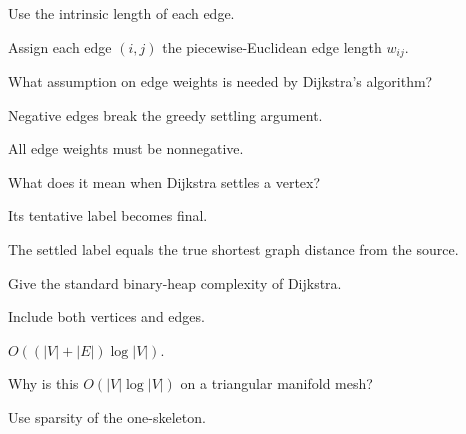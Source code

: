 \begin{hint}
Use the intrinsic length of each edge.
\end{hint}

\begin{solution}
Assign each edge \((i,j)\) the piecewise-Euclidean edge length \(w_{ij}\).
\end{solution}

\begin{exercise}\label{exr:vii39-02}
What assumption on edge weights is needed by Dijkstra's algorithm?
\end{exercise}

\begin{hint}
Negative edges break the greedy settling argument.
\end{hint}

\begin{solution}
All edge weights must be nonnegative.
\end{solution}

\begin{exercise}\label{exr:vii39-03}
What does it mean when Dijkstra settles a vertex?
\end{exercise}

\begin{hint}
Its tentative label becomes final.
\end{hint}

\begin{solution}
The settled label equals the true shortest graph distance from the source.
\end{solution}

\begin{exercise}\label{exr:vii39-04}
Give the standard binary-heap complexity of Dijkstra.
\end{exercise}

\begin{hint}
Include both vertices and edges.
\end{hint}

\begin{solution}
\(O((|V|+|E|)\log |V|)\).
\end{solution}

\begin{exercise}\label{exr:vii39-05}
Why is this \(O(|V|\log|V|)\) on a triangular manifold mesh?
\end{exercise}

\begin{hint}
Use sparsity of the one-skeleton.
\end{hint}

